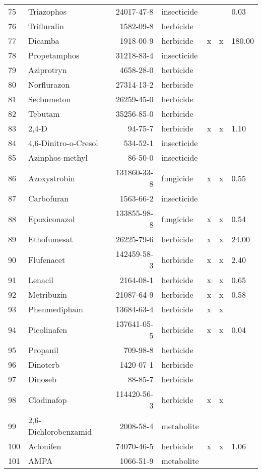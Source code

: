 \begin{longtable}{lp{3cm}rlp{0.5cm}p{0.5cm}p{1cm}}
  75 & Triazophos & 24017-47-8 & insecticide &  &  & 0.03 \\ 
  76 & Trifluralin & 1582-09-8 & herbicide &  &  &  \\ 
  77 & Dicamba & 1918-00-9 & herbicide & x & x & 180.00 \\ 
  78 & Propetamphos & 31218-83-4 & insecticide &  &  &  \\ 
  79 & Aziprotryn & 4658-28-0 & herbicide &  &  &  \\ 
  80 & Norflurazon & 27314-13-2 & herbicide &  &  &  \\ 
  81 & Secbumeton & 26259-45-0 & herbicide &  &  &  \\ 
  82 & Tebutam & 35256-85-0 & herbicide &  &  &  \\ 
  83 & 2,4-D & 94-75-7 & herbicide & x & x & 1.10 \\ 
  84 & 4,6-Dinitro-o-Cresol & 534-52-1 & insecticide &  &  &  \\ 
  85 & Azinphos-methyl & 86-50-0 & insecticide &  &  &  \\ 
  86 & Azoxystrobin & 131860-33-8 & fungicide & x & x & 0.55 \\ 
  87 & Carbofuran & 1563-66-2 & insecticide &  &  &  \\ 
  88 & Epoxiconazol & 133855-98-8 & fungicide & x & x & 0.54 \\ 
  89 & Ethofumesat & 26225-79-6 & herbicide & x & x & 24.00 \\ 
  90 & Flufenacet & 142459-58-3 & herbicide & x & x & 2.40 \\ 
  91 & Lenacil & 2164-08-1 & herbicide & x & x & 0.65 \\ 
  92 & Metribuzin & 21087-64-9 & herbicide & x & x & 0.58 \\ 
  93 & Phenmedipham & 13684-63-4 & herbicide & x & x &  \\ 
  94 & Picolinafen & 137641-05-5 & herbicide & x & x & 0.04 \\ 
  95 & Propanil & 709-98-8 & herbicide &  &  &  \\ 
  96 & Dinoterb & 1420-07-1 & herbicide &  &  &  \\ 
  97 & Dinoseb & 88-85-7 & herbicide &  &  &  \\ 
  98 & Clodinafop & 114420-56-3 & herbicide & x & x &  \\ 
  99 & 2,6-Dichlorobenzamid & 2008-58-4 & metabolite &  &  &  \\ 
  100 & Aclonifen & 74070-46-5 & herbicide & x & x & 1.06 \\ 
  101 & AMPA & 1066-51-9 & metabolite &  &  &  \\ 

\end{longtable}
